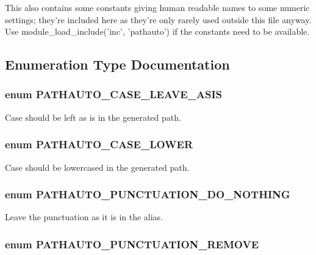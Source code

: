 This also contains some constants giving human readable names to some numeric settings; they're included here as they're only rarely used outside this file anyway. Use module\_\-load\_\-include('inc', 'pathauto') if the constants need to be available. 

\subsection{Enumeration Type Documentation}
\hypertarget{pathauto_8inc_a70a76b2fb16c0b865f671bda8b720edb}{
\subsubsection[{PATHAUTO\_\-CASE\_\-LEAVE\_\-ASIS}]{\setlength{\rightskip}{0pt plus 5cm}enum {\bf PATHAUTO\_\-CASE\_\-LEAVE\_\-ASIS}}}
\label{pathauto_8inc_a70a76b2fb16c0b865f671bda8b720edb}
Case should be left as is in the generated path. \hypertarget{pathauto_8inc_a35b6bbe534b05c42eeb8945b6ffe2a50}{
\subsubsection[{PATHAUTO\_\-CASE\_\-LOWER}]{\setlength{\rightskip}{0pt plus 5cm}enum {\bf PATHAUTO\_\-CASE\_\-LOWER}}}
\label{pathauto_8inc_a35b6bbe534b05c42eeb8945b6ffe2a50}
Case should be lowercased in the generated path. \hypertarget{pathauto_8inc_a2b584fde6bb4b7c7fb17c3e2f9ca3b65}{
\subsubsection[{PATHAUTO\_\-PUNCTUATION\_\-DO\_\-NOTHING}]{\setlength{\rightskip}{0pt plus 5cm}enum {\bf PATHAUTO\_\-PUNCTUATION\_\-DO\_\-NOTHING}}}
\label{pathauto_8inc_a2b584fde6bb4b7c7fb17c3e2f9ca3b65}
Leave the punctuation as it is in the alias. \hypertarget{pathauto_8inc_af1defa37ae4d736ee2fd0701548faa6a}{
\subsubsection[{PATHAUTO\_\-PUNCTUATION\_\-REMOVE}]{\setlength{\rightskip}{0pt plus 5cm}enum {\bf PATHAUTO\_\-PUNCTUATION\_\-REMOVE}}}
